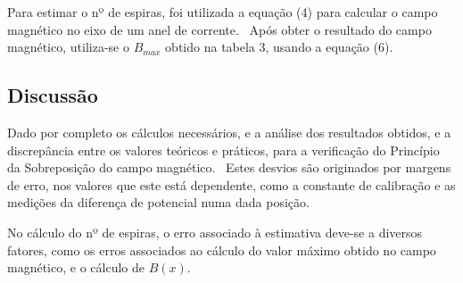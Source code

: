 {    \par Para estimar o nº de espiras, foi utilizada a equação (4) para calcular o campo magnético no eixo de um anel de corrente. \ Após obter o resultado do campo magnético,  utiliza-se o $B_{max}$ obtido na tabela 3, usando a equação (6).


\subsection{Discussão}
\label{subsec:analise-discussao-parte2-discussao}
    Dado por completo os cálculos necessários, e a análise dos resultados obtidos, e a discrepância entre os valores teóricos e práticos, para a verificação do Princípio da Sobreposição do campo magnético. \ Estes desvios são originados por margens de erro, nos valores que este está dependente, como a constante de calibração e as medições da diferença de potencial numa dada posição.

    \par No cálculo do nº de espiras, o erro associado à estimativa deve-se a diversos fatores, como os erros associados ao cálculo do valor máximo obtido no campo magnético, e o cálculo de $B(x)$.

}
